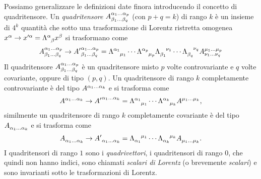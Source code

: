 Possiamo generalizzare le definizioni date finora introducendo il concetto di
quadritensore.  Un \emph{quadritensore}
$\tensor*{A}{^{\alpha_{1}\dots\alpha_{p}}_{\beta_{1}\dots\beta_{q}}}$ (con
$p + q = k$) di rango $k$ è un insieme di $4^{k}$ quantità che sotto una
trasformazione di Lorentz ristretta omogenea
$x^{\alpha} \to x'^{\alpha} = \tensor{\Lambda}{^{\alpha}_{\beta}}x^{\beta}$ si
trasformano come
\begin{equation}
  \tensor*{A}{^{\alpha_{1}\dots\alpha_{p}}_{\beta_{1}\dots\beta_{q}}} \to
  \tensor*{{A'}}{^{\alpha_{1}\dots\alpha_{p}}_{\beta_{1}\dots\beta_{q}}} =
  \tensor{\Lambda}{^{\alpha_{1}}_{\mu_{1}}} \cdots
  \tensor{\Lambda}{^{\alpha_{p}}_{\mu_{p}}}
  \tensor{\Lambda}{_{\beta_{1}}^{\nu_{1}}} \cdots
  \tensor{\Lambda}{_{\beta_{q}}^{\nu_{q}}}
  \tensor*{A}{^{\mu_{1}\dots\mu_{p}}_{\nu_{1}\dots\nu_{q}}}
\end{equation}
Il quadritensore
$\tensor*{A}{^{\alpha_{1}\dots\alpha_{p}}_{\beta_{1}\dots\beta_{q}}}$ è un
quadritensore misto $p$ volte controvariante e $q$ volte covariante, oppure di
tipo $(p,q)$.  Un quadritensore di rango $k$ completamente controvariante è del
tipo $\tensor{A}{^{\alpha_{1}\dots\alpha_{k}}}$ e si trasforma come
\begin{equation}
  \tensor{A}{^{\alpha_{1}\dots\alpha_{k}}} \to
  \tensor{{A'}}{^{\alpha_{1}\dots\alpha_{k}}} =
  \tensor{\Lambda}{^{\alpha_{1}}_{\mu_{1}}} \cdots
  \tensor{\Lambda}{^{\alpha_{k}}_{\mu_{k}}} \tensor{A}{^{\mu_{1}\dots\mu_{k}}},
\end{equation}
similmente un quadritensore di rango $k$ completamente covariante è del tipo
$\tensor{A}{_{\alpha_{1}\dots\alpha_{k}}}$ e si trasforma come
\begin{equation}
  \tensor{A}{_{\alpha_{1}\dots\alpha_{k}}} \to
  \tensor{{A'}}{_{\alpha_{1}\dots\alpha_{k}}} =
  \tensor{\Lambda}{_{\alpha_{1}}^{\mu_{1}}} \cdots
  \tensor{\Lambda}{_{\alpha_{k}}^{\mu_{k}}} \tensor{A}{_{\mu_{1}\dots\mu_{k}}}.
\end{equation}
I quadritensori di rango $1$ sono i \emph{quadrivettori}, i
quadritensori di rango $0$, che quindi non hanno indici, sono chiamati
\emph{scalari di Lorentz} (o brevemente \emph{scalari}) e sono
invarianti sotto le trasformazioni di Lorentz.

